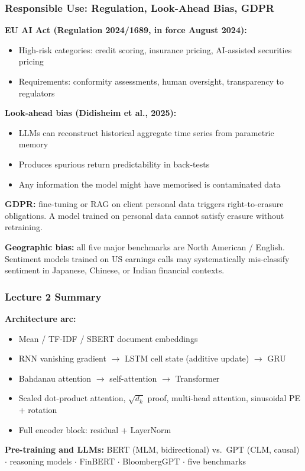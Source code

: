 \documentclass[9pt,t]{beamer}
\begin{document}
\begin{frame}
\frametitle{Responsible Use: Regulation, Look-Ahead Bias, GDPR}

\textbf{EU AI Act (Regulation 2024/1689, in force August 2024):}
\begin{itemize}
  \item High-risk categories: credit scoring, insurance pricing, AI-assisted securities pricing
  \item Requirements: conformity assessments, human oversight, transparency to regulators
\end{itemize}

\medskip
\textbf{Look-ahead bias (Didisheim et al., 2025):}
\begin{itemize}
  \item LLMs can reconstruct historical aggregate time series from parametric memory
  \item Produces spurious return predictability in back-tests
  \item Any information the model might have memorised is contaminated data
\end{itemize}

\medskip
\textbf{GDPR:} fine-tuning or RAG on client personal data triggers right-to-erasure
obligations. A model trained on personal data cannot satisfy erasure without retraining.

\medskip
\textbf{Geographic bias:} all five major benchmarks are North American / English.
Sentiment models trained on US earnings calls may systematically mis-classify
sentiment in Japanese, Chinese, or Indian financial contexts.
\end{frame}

\begin{frame}
\frametitle{Lecture 2 Summary}

\textbf{Architecture arc:}
\begin{itemize}
  \item Mean / TF-IDF / SBERT document embeddings
  \item RNN vanishing gradient $\to$ LSTM cell state (additive update) $\to$ GRU
  \item Bahdanau attention $\to$ self-attention $\to$ Transformer
  \item Scaled dot-product attention, $\sqrt{d_k}$ proof, multi-head attention, sinusoidal PE + rotation
  \item Full encoder block: residual + LayerNorm
\end{itemize}

\textbf{Pre-training and LLMs:}
BERT (MLM, bidirectional) vs.\ GPT (CLM, causal) $\cdot$ reasoning models $\cdot$ FinBERT $\cdot$ BloombergGPT $\cdot$ five benchmarks
\end{frame}
\end{document}
